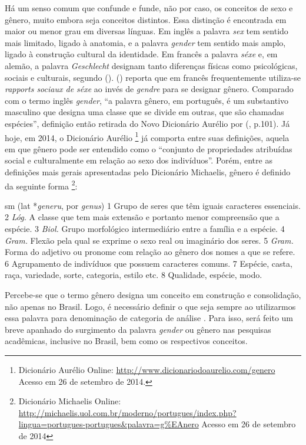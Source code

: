 Há um senso comum que confunde e funde, não por caso, os conceitos de sexo e gênero, muito embora seja conceitos distintos. Essa distinção é encontrada em maior ou menor grau em diversas línguas. Em inglês a palavra \emph{sex} tem sentido mais limitado, ligado à anatomia, e a palavra \emph{gender} tem sentido mais amplo, ligado à construção cultural da identidade. Em francês a palavra \emph{séxe} e, em alemão, a palavra \emph{Geschlecht} designam tanto diferenças físicas como psicológicas, sociais e culturais, segundo (\citeyear{FRAISSE2001}). (\citeyear{MORAES1998}) reporta que em francês frequentemente utiliza-se \emph{rapports sociaux de séxe} ao invés de \emph{gendre} para se designar gênero. Comparado com o termo inglês \emph{gender}, ``a palavra gênero, em português, é um substantivo masculino que designa uma classe que se divide em outras, que são chamadas espécies'', definição então retirada do Novo Dicionário Aurélio por (\citeyear{MORAES1998}, p.101).
Já hoje, em 2014, o Dicionário Aurélio
\footnote{Dicionário Aurélio Online: \url{http://www.dicionariodoaurelio.com/genero} Acesso em 26 de setembro de 2014.}
já comporta entre suas definições, aquela em que gênero pode ser entendido como o ``conjunto de propriedades atribuídas social e culturalmente em relação ao sexo dos indivíduos''.
Porém, entre as definições mais gerais apresentadas pelo Dicionário Michaelis, gênero é definido da seguinte forma
\footnote{Dicionário Michaelis Online: \url{http://michaelis.uol.com.br/moderno/portugues/index.php?lingua=portugues-portugues&palavra=g\%EAnero} Acesso em 26 de setembro de 2014}:

\begin{citacao}
sm (lat *\emph{generu}, por \emph{genus}) 1 Grupo de seres que têm iguais caracteres essenciais. 2 \emph{Lóg.} A classe que tem mais extensão e portanto menor compreensão que a espécie. 3 \emph{Biol.} Grupo morfológico intermediário entre a família e a espécie. 4 \emph{Gram.} Flexão pela qual se exprime o sexo real ou imaginário dos seres. 5 \emph{Gram.} Forma do adjetivo ou pronome com relação ao gênero dos nomes a que se refere. 6 Agrupamento de indivíduos que possuem caracteres comuns. 7 Espécie, casta, raça, variedade, sorte, categoria, estilo etc. 8 Qualidade, espécie, modo.
\end{citacao}

Percebe-se que o termo gênero designa um conceito em construção e consolidação, não apenas no Brasil. Logo, é necessário definir o que seja sempre ao utilizarmos essa palavra para denominação de categoria de análise \cite{MORAES1998}. Para isso, será feito um breve apanhado do surgimento da palavra \emph{gender} ou gênero nas pesquisas acadêmicas, inclusive no Brasil, bem como os respectivos conceitos.

